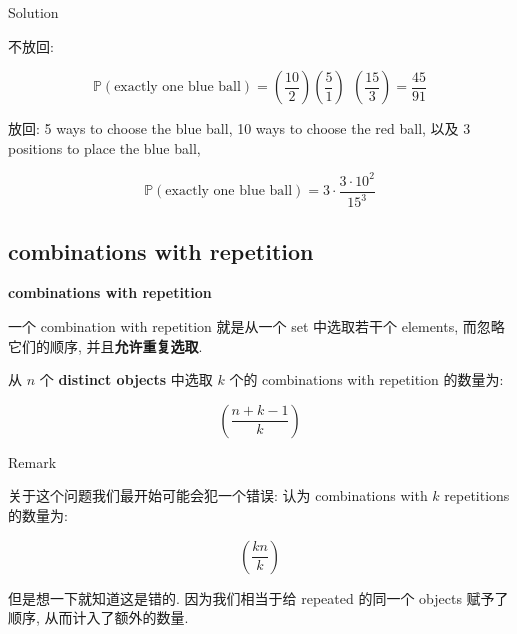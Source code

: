 \documentclass{qlnotes-export}
\begin{document}
\begin{qlsolution}{Solution}

不放回:

\[{\mathbb{P}}(\text{exactly one blue ball}) = \left( \frac{10}{2} \right)\left( \frac{5}{1} \right)\ \ \left( \frac{15}{3} \right) = \frac{45}{91}\]

放回: 5 ways to choose the blue ball, 10 ways to choose the red ball, 以及 3 positions to place the blue ball,

\[{\mathbb{P}}(\text{exactly one blue ball}) = 3 \cdot \frac{3 \cdot 10^{2}}{15^{3}}\]

\end{qlsolution}

\subsection{combinations with repetition}\label{combinations-with-repetition}

\begin{definition}{\protect{}\label{kn-combinations-with-repetition}{\textbf{combinations
with repetition}}}

一个 combination with repetition 就是从一个 set 中选取若干个 elements, 而忽略它们的顺序, 并且\textbf{允许重复选取}.

\end{definition}

\begin{proposition}

从 \(n\) 个 \textbf{distinct objects} 中选取 \(k\) 个的 combinations with repetition 的数量为:

\[\left( \frac{n + k - 1}{k} \right)\]

\end{proposition}

\begin{qlremark}{Remark}

关于这个问题我们最开始可能会犯一个错误: 认为 combinations with \(k\) repetitions 的数量为:

\[\left( \frac{kn}{k} \right)\]

但是想一下就知道这是错的. 因为我们相当于给 repeated 的同一个 objects 赋予了顺序, 从而计入了额外的数量.

\end{qlremark}
\end{document}
